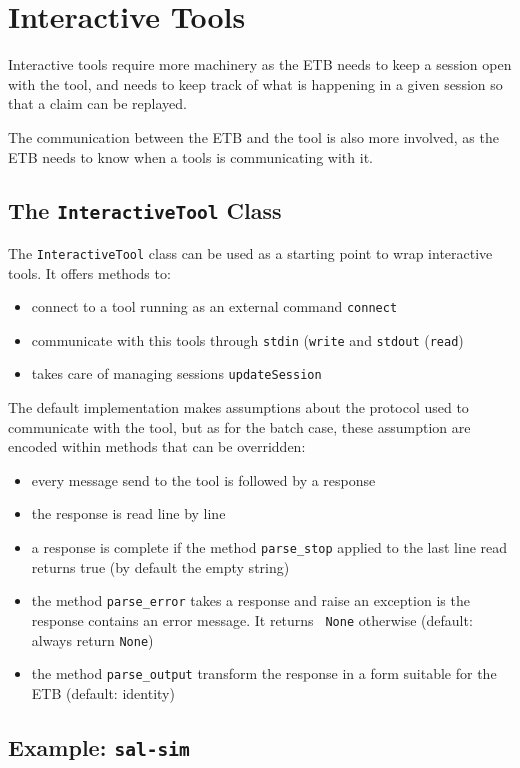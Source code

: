 \documentclass{article}
\begin{document}
\section{Interactive Tools}

Interactive tools require more machinery as the ETB needs to keep a
session open with the tool, and needs to keep track of what is
happening in a given session so that a claim can be replayed.

The communication between the ETB and the tool is also more involved,
as the ETB needs to know when a tools is communicating with it.

\subsection{The {\tt InteractiveTool} Class}

The {\tt InteractiveTool} class can be used as a starting point to
wrap interactive tools. It offers methods to:
\begin{itemize}
\item connect to a tool running as an external command {\tt connect}
\item communicate with this tools through {\tt stdin} ({\tt write} and
  {\tt stdout} ({\tt read})
\item takes care of managing sessions {\tt updateSession}
\end{itemize}
The default implementation makes assumptions about the protocol used
to communicate with the tool, but as for the batch case, these
assumption are encoded within methods that can be overridden:
\begin{itemize}
\item every message send to the tool is followed by a response
\item the response is read line by line
\item a response is complete if the method {\tt parse\_stop} applied
  to the last line read returns true (by default the empty string)
\item the method {\tt parse\_error} takes a response and raise an
  exception is the response contains an error message. It returns {\tt
    None} otherwise (default: always return {\tt None})
\item the method {\tt parse\_output} transform the response in a form
  suitable for the ETB (default: identity)
\end{itemize}

\subsection{Example: {\tt sal-sim}}
\end{document}
